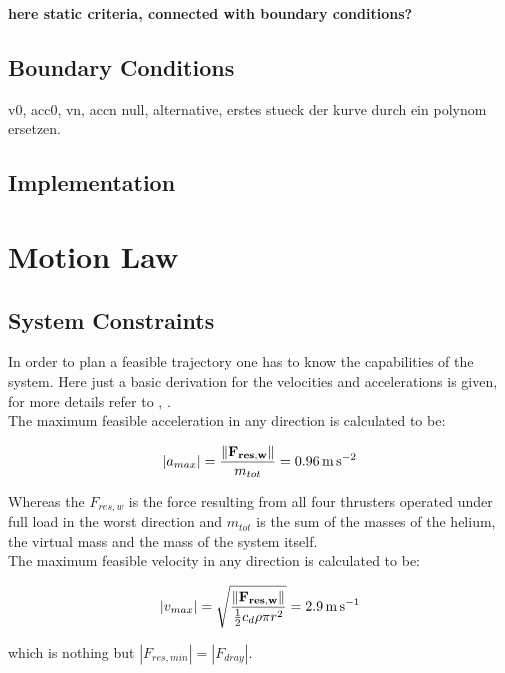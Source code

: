 {\bf here static criteria, connected with boundary conditions?}



\subsection{Boundary Conditions}
v0, acc0, vn, accn null, alternative, erstes stueck der kurve durch ein polynom ersetzen.

\subsection{Implementation}




\section{Motion Law}
\label{sec:motionLaw}
\subsection{System Constraints}
\label{subsec:systemConstraints}
In order to plan a feasible trajectory one has to know the capabilities of the system. Here just a basic derivation for the velocities and accelerations is given, for more details refer to \cite{weichart}, \cite{schaffnervu}. \\

The maximum feasible acceleration in any direction is calculated to be:

\begin{equation}
  \left|a_{max} \right| =  \frac{\| {\bf F_{res, w}}\|}{m_{tot}} = \SI{0.96}{\meter\per\square\second}
\end{equation}

Whereas the $F_{res,w}$ is the force resulting from all four thrusters operated under full load in the worst direction and $m_{tot}$ is the sum of the masses of the helium, the virtual mass and the mass of the system itself.\\


The maximum feasible velocity in any direction is calculated to be:

\begin{equation}
\left|v_{max} \right| = \sqrt{\frac{\|{\bf F_{res,w}} \|}{\frac{1}{2}c_d \rho \pi r^2}}=\SI{2.9}{\meter\per\second}
\end{equation}

which is nothing but $ \left|F_{res,min} \right| = \left|F_{dray} \right| $.\\

